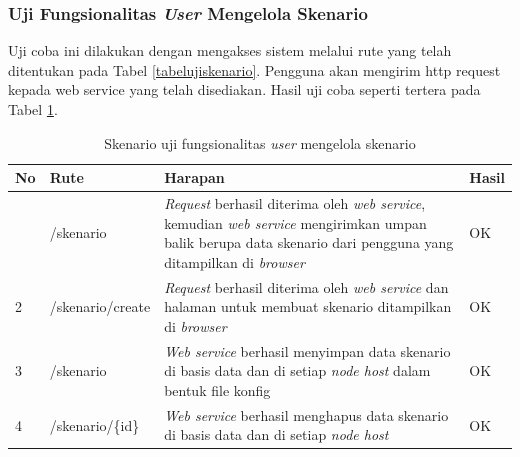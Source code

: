 			\subsubsection{Uji Fungsionalitas \textit{User} Mengelola Skenario}
				Uji coba ini dilakukan dengan mengakses sistem melalui rute yang telah ditentukan pada Tabel \ref{tabelujiskenario}. Pengguna akan mengirim http request kepada web service yang telah
				disediakan. Hasil uji coba seperti tertera pada Tabel \ref{tabelhasilujiskenario}.
				\begin{longtable}{|p{}|p{}|p{}|p{}|}
					\caption{Skenario uji fungsionalitas \textit{user} mengelola skenario} \label{tabelhasilujiskenario} \\ \hline
					\textbf{No} & \textbf{Rute} & \textbf{Harapan} & \textbf{Hasil} \\ \hline
					\endhead
					\endfoot
					\endlastfoot
					1 & /skenario & \textit{Request} berhasil diterima oleh \textit{web service}, kemudian \textit{web service} mengirimkan umpan balik berupa data skenario dari pengguna yang ditampilkan di \textit{browser} & OK \\ \hline
					2 & /skenario/create & \textit{Request} berhasil diterima oleh \textit{web service} dan halaman untuk membuat skenario ditampilkan di \textit{browser}  & OK \\ \hline
					3 & /skenario & \textit{Web service} berhasil menyimpan data skenario di basis data dan di setiap \textit{node host} dalam bentuk file konfig & OK \\ \hline
					4 & /skenario/\{id\} &\textit{Web service} berhasil menghapus data skenario di basis data dan di setiap \textit{node host} & OK \\ \hline
				\end{longtable}
				

